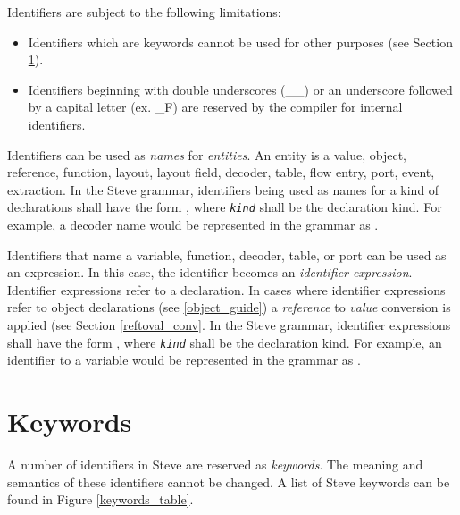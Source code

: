 Identifiers are subject to the following limitations:

\begin{itemize}
\item Identifiers which are keywords cannot be used for other purposes (see Section \ref{keyword_guide}).

\item Identifiers beginning with double underscores (\_\_) or an underscore followed by a capital letter (ex. \_F) are reserved by the compiler for internal identifiers.
\end{itemize}

Identifiers can be used as \textit{names} for \textit{entities}. An entity is a value, object, reference, function, layout, layout field, decoder, table, flow entry, port, event, extraction. In the Steve grammar, identifiers being used as names for a kind of declarations shall have the form , where \texttt{\textit{kind}} shall be the declaration kind. For example, a decoder name would be represented in the grammar as .

Identifiers that name a variable, function, decoder, table, or port can be used as an expression. In this case, the identifier becomes an \textit{identifier expression}. Identifier expressions refer to a declaration. In cases where identifier expressions refer to object declarations (see \ref{object_guide}) a \textit{reference} to \textit{value} conversion is applied (see Section \ref{reftoval_conv}. In the Steve grammar, identifier expressions shall have the form , where \texttt{\textit{kind}} shall be the declaration kind. For example, an identifier to a variable would be represented in the grammar as .

\section{Keywords} \label{keyword_guide}

A number of identifiers in Steve are reserved as \textit{keywords}. The meaning and semantics of these identifiers cannot be changed. A list of Steve keywords can be found in Figure \ref{keywords_table}.

